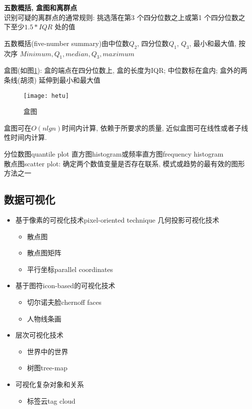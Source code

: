 \documentclass{article}
\begin{document}
\textbf{五数概括, 盒图和离群点}\\
识别可疑的离群点的通常规则: 挑选落在第3 个四分位数之上或第1 个四分位数之下至少$1.5 * IQR$ 处的值\par
五数概括(five-number summary)由中位数$Q_2$, 四分位数$Q_1$, $Q_3$, 最小和最大值, 按次序
$Minimum, Q_1, median, Q_3, maximum$\par
盒图(如图\ref{fig.hetu}): 盒的端点在四分位数上, 盒的长度为IQR; 中位数标在盒内; 盒外的两条线(胡须) 延伸到最小和最大值\\
\begin{figure}[htbp]
  \centering
  \texttt{[image: hetu]}\\
  \caption{盒图}
  \label{fig.hetu}
\end{figure}

盒图可在$O(nlgn)$时间内计算, 依赖于所要求的质量, 近似盒图可在线性或者子线性时间内计算.

分位数图quantile plot
直方图histogram或频率直方图frequency histogram\\
散点图scatter plot: 确定两个数值变量是否存在联系, 模式或趋势的最有效的图形方法之一\\

\subsection{数据可视化}
\begin{itemize}
\item 基于像素的可视化技术pixel-oriented technique
几何投影可视化技术
	\begin{itemize}
	\item 散点图
	\item 散点图矩阵
    \item 平行坐标parallel coordinates
	\end{itemize}
\item 基于图符icon-based的可视化技术
	\begin{itemize}
	\item 切尔诺夫脸chernoff faces
	\item 人物线条画
	\end{itemize}
\item 层次可视化技术
	\begin{itemize}
	\item 世界中的世界
	\item 树图tree-map
	\end{itemize}
\item 可视化复杂对象和关系
	\begin{itemize}
	\item 标签云tag cloud
	\end{itemize}
\end{itemize}
	
\end{document}
